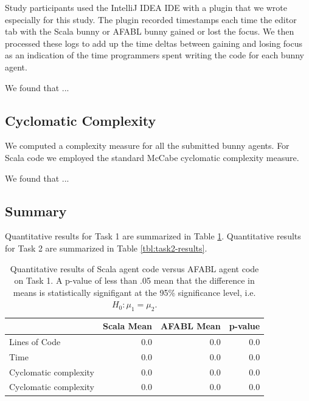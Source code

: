Study participants used the IntelliJ IDEA IDE with a plugin that we wrote especially for this study. The plugin recorded timestamps each time the editor tab with the Scala bunny or AFABL bunny gained or lost the focus. We then processed these logs to add up the time deltas between gaining and losing focus as an indication of the time programmers spent writing the code for each bunny agent.

We found that ...

\subsection{Cyclomatic Complexity}

We computed a complexity measure for all the submitted bunny agents. For Scala code we employed the standard McCabe cyclomatic complexity measure.

We found that ...

\subsection{Summary}

Quantitative results for Task 1 are summarized in Table \ref{tbl:task1-results}. Quantitative results for Task 2 are summarized in Table \ref{tbl:task2-results}.

\begin{center}
\begin{table}[h]
\begin{tabular}{|l|r|r|r|}\hline
                      & Scala Mean & AFABL Mean & p-value \\\hline
Lines of Code         & 0.0        & 0.0        & 0.0 \\
Time                  & 0.0        & 0.0        & 0.0 \\
Cyclomatic complexity & 0.0        & 0.0        & 0.0 \\
Cyclomatic complexity & 0.0        & 0.0        & 0.0 \\\hline
\end{tabular}
\caption{Quantitative results of Scala agent code versus AFABL agent code on Task 1. A p-value of less than .05 mean that the difference in means is statistically signifigant at the 95\% significance level, i.e. $H_0: \mu_1 = \mu_2$.}
\label{tbl:task1-results}
\end{table}
\end{center}

